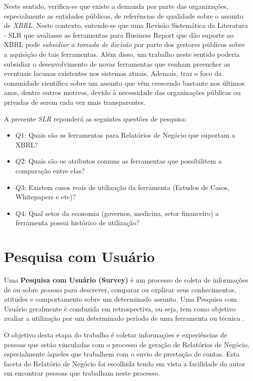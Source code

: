 \documentclass[msc,proposal,hidelot,hideabstract]{ppgccufmg} %
\begin{document}
Neste sentido, verifica-se que existe a demanda por parte das organizações, especialmente as entidades públicas, de referências de qualidade sobre o assunto de \textit{XBRL}. Neste contexto, entende-se que uma Revisão Sistemática da Literatura - SLR  que avaliasse as ferramentas para Business Report que dão suporte ao XBRL pode \textit{subsidiar a tomada de decisão} por parte dos gestores públicos sobre a aquisição de tais ferramentas. Além disso, um trabalho neste sentido poderia subsidiar o desenvolvimento de novas ferramentas que venham preencher as eventuais lacunas existentes nos sistemas atuais. Ademais, traz o foco da comunidade científica sobre um assunto que vêm crescendo bastante nos últimos anos, dentre outros motivos, devido à necessidade das organizações públicas ou privadas de serem cada vez mais transparentes.

A presente \textit{SLR} reponderá as seguintes questões de pesquisa:

\begin{itemize}
  \item \textbf{$Q1$}: Quais são as ferramentas para Relatórios de Negócio que
    suportam a XBRL?
  \item \textbf{$Q2$}: Quais são os atributos comuns as ferramentas
    que possibilitem a comparação entre elas?
  \item \textbf{$Q3$}: Existem casos reais de utilização da ferramenta
    (Estudos de Casos, Whitepapers e etc)?
  \item \textbf{$Q4$}: Qual setor da economia (governos, medicina, setor financeiro) a ferramenta possui histórico de utilização?
\end{itemize}

\section{Pesquisa com Usuário}
\label{sec:survey}

Uma \textbf{Pesquisa com Usuário (Survey)} é um processo de
coleta de informações de ou sobre
\textit{pessoas} para descrever, comparar ou explicar seus
conhecimentos, atitudes e comportamento sobre um determinado
assunto\cite{fink2003survey}. Uma Pesquisa com Usuário geralmente é conduzida em retrospectiva, ou seja, tem como
objetivo avaliar a utilização por um determinado período de uma
ferramenta ou técnica \cite{kitchenham2009systematic}.

O objetivo desta etapa do trabalho é coletar informações e experiências de
pessoas que estão vinculadas com o processo de geração de Relatórios de
Negócio, especialmente àqueles que trabalhem com o envio de prestação de
contas. Esta faceta do Relatório de Negócio foi escolhida tendo em vista a
facilidade do autor em encontrar pessoas que trabalham neste processo.
\end{document}

